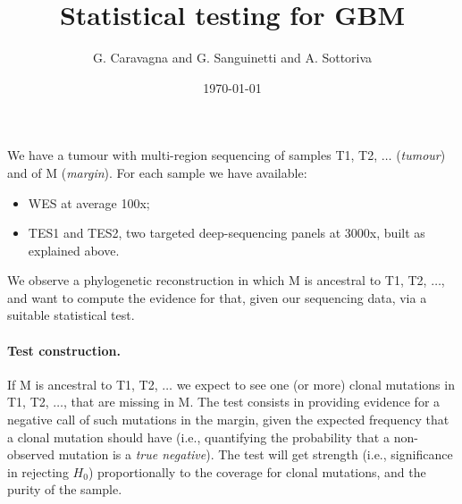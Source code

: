 \documentclass[10pt]{article}
\title{Statistical testing for GBM}
\begin{document}


\date{\today}
\author{G. Caravagna and G. Sanguinetti and A. Sottoriva}

\maketitle



We have a tumour with  multi-region sequencing of samples {\sf T1},  {\sf T2}, $\ldots$ ({\em tumour})  and of    {\sf M} ({\em margin}). For each sample we have available:
\begin{itemize}
\item WES at average 100x;
\item TES1 and TES2, two targeted deep-sequencing panels at 3000x, built as explained above.
\end{itemize}

We observe a phylogenetic reconstruction in which  {\sf M} is ancestral to 
 {\sf T1},  {\sf T2}, $\ldots$, and want to compute the evidence for that, given our sequencing data, via a suitable statistical test. 

 \paragraph{Test construction.}
If {\sf M} is ancestral to  {\sf T1},  {\sf T2}, $\ldots$ we expect to see one (or more) clonal mutations in {\sf T1},  {\sf T2}, $\ldots$, that are missing in  {\sf M}. The test  consists in providing evidence for a negative call of such mutations in the margin, given the expected frequency that a clonal mutation   should have
 (i.e., quantifying the probability that a non-observed mutation is a {\em true negative}).  The test will get strength (i.e., significance in rejecting $H_0$) proportionally to the coverage for clonal mutations, and the purity of the sample.
\end{document}
